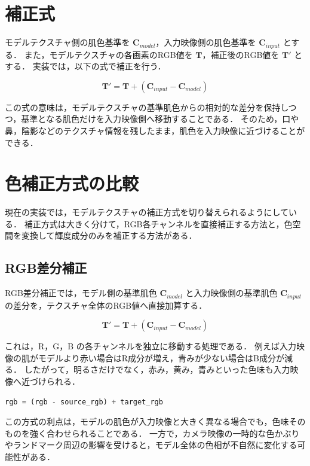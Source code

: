 \documentclass[uplatex,dvipdfmx]{jsarticle}
\begin{document}
\section{補正式}

モデルテクスチャ側の肌色基準を $\mathbf{C}_{model}$，入力映像側の肌色基準を $\mathbf{C}_{input}$ とする．
また，モデルテクスチャの各画素のRGB値を $\mathbf{T}$，補正後のRGB値を $\mathbf{T}'$ とする．
実装では，以下の式で補正を行う．

\begin{equation}
  \mathbf{T}' = \mathbf{T} + (\mathbf{C}_{input} - \mathbf{C}_{model})
\end{equation}

この式の意味は，モデルテクスチャの基準肌色からの相対的な差分を保持しつつ，基準となる肌色だけを入力映像側へ移動することである．
そのため，口や鼻，陰影などのテクスチャ情報を残したまま，肌色を入力映像に近づけることができる．

\section{色補正方式の比較}

現在の実装では，モデルテクスチャの補正方式を切り替えられるようにしている．
補正方式は大きく分けて，RGB各チャンネルを直接補正する方法と，色空間を変換して輝度成分のみを補正する方法がある．

\subsection{RGB差分補正}

RGB差分補正では，モデル側の基準肌色 $\mathbf{C}_{model}$ と入力映像側の基準肌色 $\mathbf{C}_{input}$ の差分を，テクスチャ全体のRGB値へ直接加算する．

\begin{equation}
  \mathbf{T}' = \mathbf{T} + (\mathbf{C}_{input} - \mathbf{C}_{model})
\end{equation}

これは，R，G，B の各チャンネルを独立に移動する処理である．
例えば入力映像の肌がモデルより赤い場合はR成分が増え，青みが少ない場合はB成分が減る．
したがって，明るさだけでなく，赤み，黄み，青みといった色味も入力映像へ近づけられる．

\begin{lstlisting}[language=Python]
rgb = (rgb - source_rgb) + target_rgb
\end{lstlisting}

この方式の利点は，モデルの肌色が入力映像と大きく異なる場合でも，色味そのものを強く合わせられることである．
一方で，カメラ映像の一時的な色かぶりやランドマーク周辺の影響を受けると，モデル全体の色相が不自然に変化する可能性がある．
\end{document}
